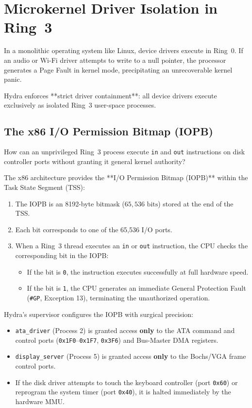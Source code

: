 \section{Microkernel Driver Isolation in Ring~3}
\label{sec:driver_isolation_deep}

In a monolithic operating system like Linux, device drivers execute in Ring~0. If an audio or Wi-Fi driver attempts to write to a null pointer, the processor generates a Page Fault in kernel mode, precipitating an unrecoverable kernel panic.

Hydra enforces **strict driver containment**: all device drivers execute exclusively as isolated Ring~3 user-space processes.

\subsection{The x86 I/O Permission Bitmap (IOPB)}
How can an unprivileged Ring~3 process execute \texttt{in} and \texttt{out} instructions on disk controller ports without granting it general kernel authority?

The x86 architecture provides the **I/O Permission Bitmap (IOPB)** within the Task State Segment (TSS):
\begin{enumerate}
    \item The IOPB is an 8192-byte bitmask ($65,536\text{ bits}$) stored at the end of the TSS.
    \item Each bit corresponds to one of the 65,536 I/O ports.
    \item When a Ring~3 thread executes an \texttt{in} or \texttt{out} instruction, the CPU checks the corresponding bit in the IOPB:
    \begin{itemize}
        \item If the bit is \texttt{0}, the instruction executes successfully at full hardware speed.
        \item If the bit is \texttt{1}, the CPU generates an immediate General Protection Fault (\texttt{\#GP}, Exception 13), terminating the unauthorized operation.
    \end{itemize}
\end{enumerate}

Hydra's supervisor configures the IOPB with surgical precision:
\begin{itemize}
    \item \texttt{ata\_driver} (Process 2) is granted access \textbf{only} to the ATA command and control ports (\texttt{0x1F0}--\texttt{0x1F7}, \texttt{0x3F6}) and Bus-Master DMA registers.
    \item \texttt{display\_server} (Process 5) is granted access \textbf{only} to the Bochs/VGA frame control ports.
    \item If the disk driver attempts to touch the keyboard controller (port \texttt{0x60}) or reprogram the system timer (port \texttt{0x40}), it is halted immediately by the hardware MMU.
\end{itemize}

